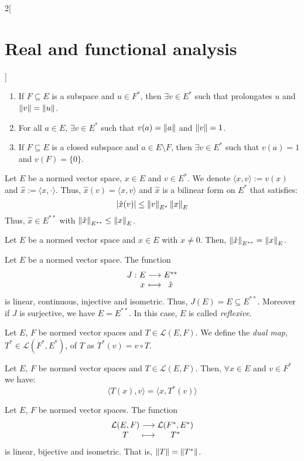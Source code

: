 \documentclass[../../../main_math.tex]{subfiles}
\begin{document}
\begin{multicols}{2}[\section{Real and functional analysis}]
\begin{theorem}
\begin{enumerate}
      \item If $F\subseteq E$ is a subspace and $u\in F^*$, then $\exists v\in E^*$ such that prolongates $u$ and $\left\|v\right\|=\left\|u\right\|$.
      \item For all $a\in E$, $\exists v\in E^*$ such that $v(a)=\left\|a\right\|$ and $\left\|v\right\|=1$.
      \item If $F\subseteq E$ is a closed subspace and $a\in E\setminus F$, then $\exists v\in E^*$ such that $v(a)=1$ and $v(F)=\{0\}$.
    \end{enumerate}
  \end{theorem}
  \begin{definition}
    Let $E$ be a normed vector space, $x\in E$ and $v\in E^*$. We denote $\langle x,v\rangle := v(x)$ and $\hat{x}:=\langle x,\cdot\rangle$. Thus, $\hat{x}(v)=\langle x,v\rangle$ and $\hat{x}$ is a bilinear form on $E^*$ that satisfies: $$\abs{\hat{x}(v)}\leq\left\|v\right\|_{E^*}\left\|x\right\|_E$$ Thus, $\hat{x}\in E^{**}$ with $\left\|\hat{x}\right\|_{E^{**}}\leq \left\|x\right\|_E$.
  \end{definition}
  \begin{proposition}
    Let $E$ be a normed vector space and $x\in E$ with $x\ne 0$. Then, $\left\|\hat{x}\right\|_{E^{**}}= \left\|x\right\|_E$.
  \end{proposition}
  \begin{proposition}
    Let $E$ be a normed vector space. The function $$\function{J}{E}{E^{**}}{x}{\hat{x}}$$ is linear, continuous, injective and isometric. Thus, $J(E)=E\subseteq E^{**}$. Moreover if $J$ is surjective, we have $E=E^{**}$. In this case, $E$ is called \emph{reflexive}.
  \end{proposition}
  \begin{definition}
    Let $E$, $F$ be normed vector spaces and $T\in\mathcal{L}(E,F)$. We define the \emph{dual map}, $T^*\in\mathcal{L}(F^*,E^*)$, of $T$ as $T^*(v)=v\circ T$.
  \end{definition}
  \begin{proposition}
    Let $E$, $F$ be normed vector spaces and $T\in\mathcal{L}(E,F)$. Then, $\forall x\in E$ and $v\in F^*$ we have: $$\langle T(x),v\rangle=\langle x,T^*(v)\rangle$$
  \end{proposition}
  \begin{proposition}
    Let $E$, $F$ be normed vector spaces. The function $$\function{}{\mathcal{L}(E,F)}{\mathcal{L}(F^*,E^*)}{T}{T^*}$$ is linear, bijective and isometric. That is, $\left\|T\right\|=\left\|T^*\right\|$.
  \end{proposition}

\end{multicols}
\end{document}
